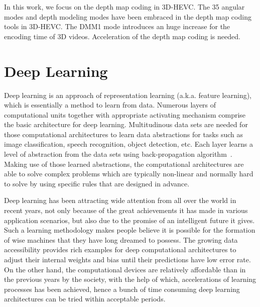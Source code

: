 In this work, we focus on the depth map coding in 3D-HEVC\@.
The 35 angular modes and depth modeling modes have been embraced in the
depth map coding tools in 3D-HEVC\@.
The DMM1 mode introduces an huge increase for the encoding time of 3D videos.
Acceleration of the depth map coding is needed.

\section{Deep Learning}\label{sec:deep-learning}
Deep learning is an approach of representation learning
(a.k.a. feature learning), which is essentially a method to
learn from data.
Numerous layers of computational units together with appropriate activating
mechanism comprise the basic architecture for deep learning.
Multitudinous data sets are needed for those computational architectures
to learn data abstractions
for tasks such as image classification, speech recognition,
object detection, etc.
Each layer learns a level of abstraction from the data sets using
back-propagation algorithm~\parencite{RN96}.
Making use of those learned abstractions, the computational architectures are
able to solve complex problems which are typically non-linear and normally hard
to solve by using specific rules that are designed in advance.

Deep learning has been attracting wide attention from all over the world
in recent years, not only because of the great achievements it has
made in various application scenarios, but also due to the promise of an
intelligent future it gives.
Such a learning methodology makes people believe it is possible
for the formation of wise machines
that they have long dreamed to possess.
The growing data accessibility provides rich examples for deep computational
architectures to adjust their internal weights and bias until their
predictions have low error rate.
On the other hand, the computational devices are relatively
affordable than in the previous years by the society, with the help of which,
accelerations of learning processes has been achieved, hence a bunch of
time consuming deep learning architectures can be tried within acceptable
periods.

